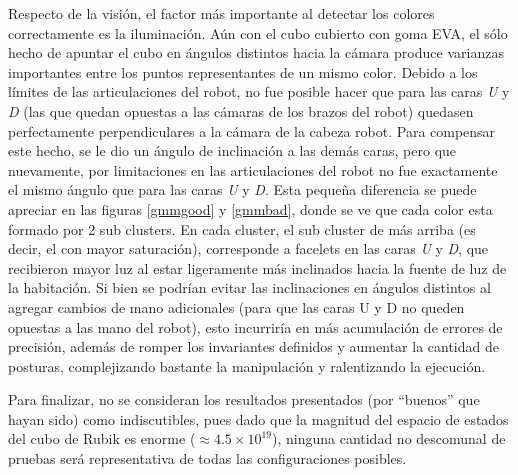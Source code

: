 Respecto de la visión, el factor más importante al detectar los colores correctamente es la iluminación. Aún con el cubo cubierto con goma EVA, el sólo hecho de apuntar el cubo en ángulos distintos hacia la cámara produce varianzas importantes entre los puntos representantes de un mismo color. Debido a los límites de las articulaciones del robot, no fue posible hacer que para las caras \emph{U} y \emph{D} (las que quedan opuestas a las cámaras de los brazos del robot) quedasen perfectamente perpendiculares a la cámara de la cabeza robot. Para compensar este hecho, se le dio un ángulo de inclinación a las demás caras, pero que nuevamente, por limitaciones en las articulaciones del robot no fue exactamente el mismo ángulo que para las caras \emph{U} y \emph{D}. Esta pequeña diferencia se puede apreciar en las figuras \ref{gmmgood} y \ref{gmmbad}, donde se ve que cada color esta formado por 2 sub clusters. En cada cluster, el sub cluster de más arriba (es decir, el con mayor saturación), corresponde a facelets en las caras \emph{U} y \emph{D}, que recibieron mayor luz al estar ligeramente más inclinados hacia la fuente de luz de la habitación. Si bien se podrían evitar las inclinaciones en ángulos distintos al agregar cambios de mano adicionales (para que las caras U y D no queden opuestas a las mano del robot), esto incurriría en más acumulación de errores de precisión, además de romper los invariantes definidos y aumentar la cantidad de posturas, complejizando bastante la manipulación y ralentizando la ejecución.

Para finalizar, no se consideran los resultados presentados (por ``buenos'' que hayan sido) como indiscutibles, pues dado que la magnitud del espacio de estados del cubo de Rubik es enorme ($\approx 4.5\times 10^{19}$), ninguna cantidad no descomunal de pruebas será representativa de todas las configuraciones posibles.
